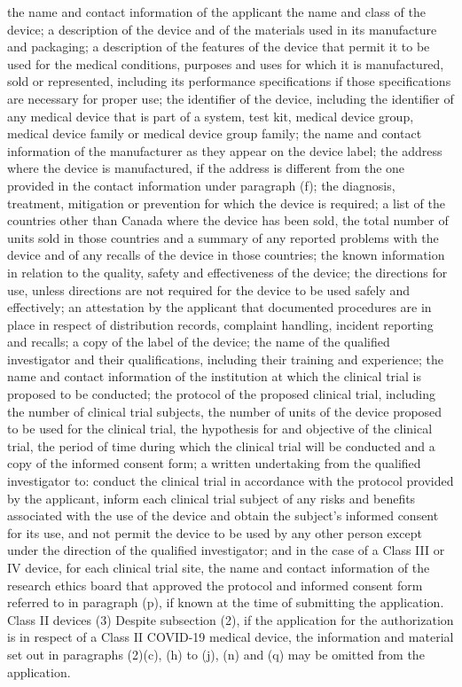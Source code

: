 \documentclass[fleqn,10pt]{paper}
\begin{document}
the name and contact information of the applicant 
the name and class of the device;
a description of the device and of the materials used in its manufacture and packaging;
a description of the features of the device that permit it to be used for the medical conditions, purposes and uses for which it is manufactured, sold or represented, including its performance specifications if those specifications are necessary for proper use;
the identifier of the device, including the identifier of any medical device that is part of a system, test kit, medical device group, medical device family or medical device group family;
the name and contact information of the manufacturer as they appear on the device label;
the address where the device is manufactured, if the address is different from the one provided in the contact information under paragraph (f);
the diagnosis, treatment, mitigation or prevention for which the device is required;
a list of the countries other than Canada where the device has been sold, the total number of units sold in those countries and a summary of any reported problems with the device and of any recalls of the device in those countries;
the known information in relation to the quality, safety and effectiveness of the device;
the directions for use, unless directions are not required for the device to be used safely and effectively;
an attestation by the applicant that documented procedures are in place in respect of distribution records, complaint handling, incident reporting and recalls;
a copy of the label of the device;
the name of the qualified investigator and their qualifications, including their training and experience;
the name and contact information of the institution at which the clinical trial is proposed to be conducted;
the protocol of the proposed clinical trial, including the number of clinical trial subjects, the number of units of the device proposed to be used for the clinical trial, the hypothesis for and objective of the clinical trial, the period of time during which the clinical trial will be conducted and a copy of the informed consent form;
a written undertaking from the qualified investigator to:
conduct the clinical trial in accordance with the protocol provided by the applicant,
inform each clinical trial subject of any risks and benefits associated with the use of the device and obtain the subject's informed consent for its use, and
not permit the device to be used by any other person except under the direction of the qualified investigator; and
in the case of a Class III or IV device, for each clinical trial site, the name and contact information of the research ethics board that approved the protocol and informed consent form referred to in paragraph (p), if known at the time of submitting the application.
Class II devices
(3) Despite subsection (2), if the application for the authorization is in respect of a Class II COVID-19 medical device, the information and material set out in paragraphs (2)‍(c), (h) to (j), (n) and (q) may be omitted from the application.
\end{document}
